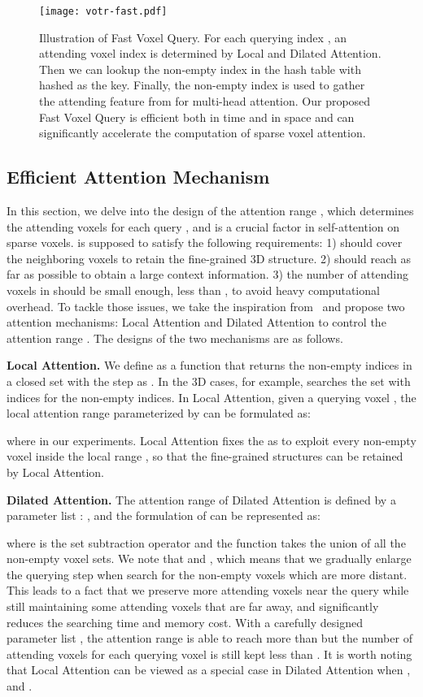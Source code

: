 \documentclass[10pt,twocolumn,letterpaper]{article}
\begin{document}
\begin{figure*}[!t]
\centering
\texttt{[image: votr-fast.pdf]}
\caption{Illustration of Fast Voxel Query. For each querying index , an attending voxel index  is determined by Local and Dilated Attention. Then we can lookup the non-empty index  in the hash table with hashed  as the key. Finally, the non-empty index  is used to gather the attending feature  from  for multi-head attention. Our proposed Fast Voxel Query is efficient both in time and in space and can significantly accelerate the computation of sparse voxel attention.}
\label{fig_fastvq}
\end{figure*}

\subsection{Efficient Attention Mechanism}
In this section, we delve into the design of the attention range , which determines the attending voxels for each query , and is a crucial factor in self-attention on sparse voxels.  is supposed to satisfy the following requirements: 1)  should cover the neighboring voxels to retain the fine-grained 3D structure. 2)  should reach as far as possible to obtain a large context information. 3) the number of attending voxels in  should be small enough, \eg less than , to avoid heavy computational overhead. To tackle those issues, we take the inspiration from~\cite{zaheer2020big} and propose two attention mechanisms: Local Attention and Dilated Attention to control the attention range . The designs of the two mechanisms are as follows.

\textbf{Local Attention.} We define  as a function that returns the non-empty indices in a closed set  with the step as . In the 3D cases, for example,  searches the set  with  indices for the non-empty indices. In Local Attention, given a querying voxel , the local attention range  parameterized by  can be formulated as: 

where  in our experiments. Local Attention fixes the  as  to exploit every non-empty voxel inside the local range , so that the fine-grained structures can be retained by Local Attention.


\textbf{Dilated Attention.} The attention range  of Dilated Attention is defined by a parameter list : , and the formulation of  can be represented as:

where  is the set subtraction operator and the function  takes the union of all the non-empty voxel sets. We note that  and , which means that we gradually enlarge the querying step  when search for the non-empty voxels which are more distant. This leads to a fact that we preserve more attending voxels near the query while still maintaining some attending voxels that are far away, and  significantly reduces the searching time and memory cost. With a carefully designed parameter list , the attention range is able to reach more than  but the number of attending voxels for each querying voxel is still kept less than . It is worth noting that Local Attention can be viewed as a special case in Dilated Attention when ,  and .
\end{document}
